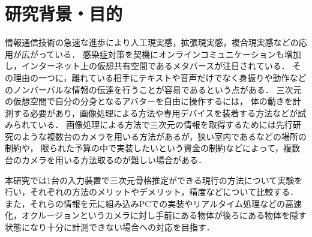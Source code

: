 \documentclass[titlepage]{jarticle}
\begin{document}
\maketitle

%
%
\section{研究背景・目的}
%
情報通信技術の急速な進歩により人工現実感，拡張現実感，複合現実感などの応用が広がっている．
感染症対策を契機にオンラインコミュニケーションも増加し，インターネット上の仮想共有空間であるメタバースが注目されている．\cite{meta}
その理由の一つに，離れている相手にテキストや音声だけでなく身振りや動作などのノンバーバルな情報の伝達を行うことが容易であるという点がある．
三次元の仮想空間で自分の分身となるアバターを自由に操作するには，
体の動きを計測する必要があり，画像処理による方法\cite{CV}や専用デバイスを装着する方法\cite{キャプチャ}などが試みられている．
画像処理による方法で三次元の情報を取得するためには先行研究のような複数台のカメラを用いる方法\cite{turugi}があるが，狭い室内であるなどの場所の制約や，
限られた予算の中で実装したいという資金の制約などによって，複数台のカメラを用いる方法取るのが難しい場合がある．

本研究では1台の入力装置で三次元骨格推定ができる現行の方法について実験を行い，それぞれの方法のメリットやデメリット，精度などについて比較する．
また，それらの情報を元に組み込みPCでの実装やリアルタイム処理などの高速化，オクルージョンというカメラに対し手前にある物体が後ろにある物体を隠す状態になり十分に計測できない場合への対応を目指す．

\end{document}
